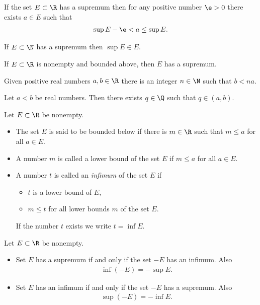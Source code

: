 \documentclass{article}
\begin{document}
\begin{theorem}
	If the set $E\subset\R$ has a supremum then for any positive number $\e>0$ there exists $a\in E$
	such that
	\begin{align*}
		\sup E -\e < a \leq \sup E.
	\end{align*}
\end{theorem}

\begin{lemma}
	If $E\subset\N$ has a supremum then $\sup E\in E$.
\end{lemma}

\begin{definition*}
	If $E\subset\R$ is nonempty and bounded above, then $E$ has a supremum.
\end{definition*}

\begin{theorem}
	Given positive real numbers $a,b\in\R$ there is an integer $n\in\N$ such that $b<na$.
\end{theorem}

\setcounter{theorem}{8}
\begin{theorem}
	Let $a<b$ be real numbers. Then there exists $q\in\Q$ such that $q\in(a,b)$.
\end{theorem}

\begin{definition}
	Let $E\subset\R$ be nonempty.
	\begin{itemize}
		\item The set $E$ is said to be bounded below if there is $m\in\R$ such that $m\leq a$ for all $a\in E$.
		\item A number $m$ is called a lower bound of the set $E$ if $m\leq a$ for all $a\in E$.
		\item A number $t$ is called an \emph{infimum} of the set $E$ if \begin{itemize}
			      \item $t$ is a lower bound of $E$,
			      \item $m\leq t$ for all lower bounds $m$ of the set $E$.
		      \end{itemize}
		      If the number $t$ exists we write $t=\inf E$.
	\end{itemize}
\end{definition}

\begin{theorem}
	Let $E\subset\R$ be nonempty.
	\begin{itemize}
		\item Set $E$ has a supremum if and only if the set $-E$ has an infimum. Also \begin{align*}
			      \inf(-E) = -\sup E.
		      \end{align*}
		\item Set $E$ has an infimum if and only if the set $-E$ has a supremum. Also \begin{align*}
			      \sup(-E) = -\inf E.
		      \end{align*}
	\end{itemize}
\end{theorem}
\end{document}

